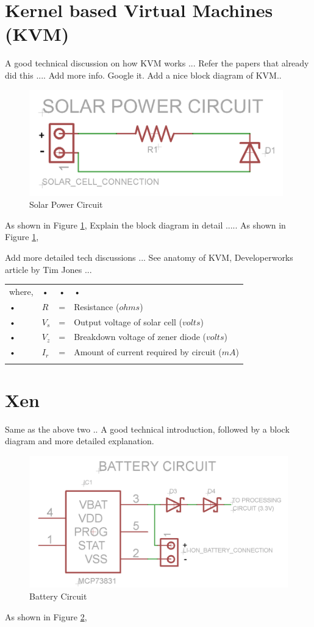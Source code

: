 \section{Kernel based Virtual Machines (KVM)}
A good technical discussion on how KVM works ... Refer the papers that already did this .... Add more info. Google it.
Add a nice block diagram of KVM..
\begin{figure}[htbp]
\centering
\includegraphics[width=110mm]{solar_pwr_ckt.PNG}
\caption{Solar Power Circuit}
\label{img_solarPowerCircuit}
\end{figure}

As shown in Figure \ref{img_solarPowerCircuit}, Explain the block diagram in detail ..... As shown in Figure \ref{img_solarPowerCircuit}, 


Add more detailed tech discussions ... See anatomy of KVM, Developerworks article by Tim Jones ... 

\begin{tabular}{lllp{10cm}}
where, & • & • & • \\ 
• & $R$ & = & Resistance ($ohms$) \\ 
• & $V_{s}$ & = & Output voltage of solar cell ($volts$) \\ 
• & $V_{z}$ & = & Breakdown voltage of zener diode ($volts$) \\ 
• & $I_{r}$ & = & Amount of current required by circuit ($mA$) \\ 
 &  &  &  \\ 
\end{tabular} 


\section{Xen}

Same as the above two .. A good technical introduction, followed by a block diagram and more detailed explanation.

\begin{figure}[htbp]
\centering
\includegraphics[width=\columnwidth]{battery_ckt.PNG}
\caption{Battery Circuit}
\label{img_batteryCircuit}
\end{figure}

As shown in Figure \ref{img_batteryCircuit}, 